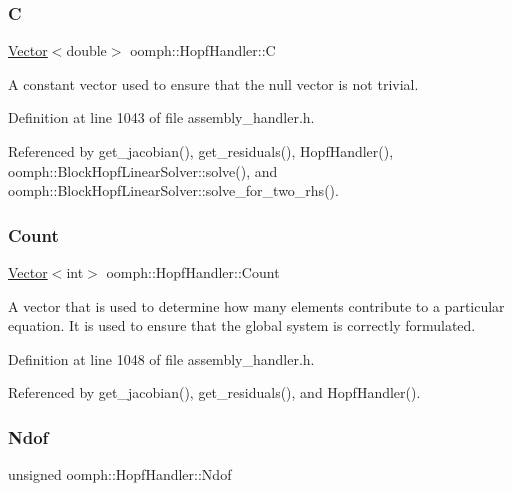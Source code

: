 \subsubsection{\texorpdfstring{C}{C}}
{\footnotesize\ttfamily \hyperlink{classoomph_1_1Vector}{Vector}$<$double$>$ oomph\+::\+Hopf\+Handler\+::C\hspace{0.3cm}{\ttfamily [private]}}



A constant vector used to ensure that the null vector is not trivial. 



Definition at line 1043 of file assembly\+\_\+handler.\+h.



Referenced by get\+\_\+jacobian(), get\+\_\+residuals(), Hopf\+Handler(), oomph\+::\+Block\+Hopf\+Linear\+Solver\+::solve(), and oomph\+::\+Block\+Hopf\+Linear\+Solver\+::solve\+\_\+for\+\_\+two\+\_\+rhs().

\mbox{\label{classoomph_1_1HopfHandler_a1b429a8220b316a487998cae04f46ec7}} 
\subsubsection{\texorpdfstring{Count}{Count}}
{\footnotesize\ttfamily \hyperlink{classoomph_1_1Vector}{Vector}$<$int$>$ oomph\+::\+Hopf\+Handler\+::\+Count\hspace{0.3cm}{\ttfamily [private]}}



A vector that is used to determine how many elements contribute to a particular equation. It is used to ensure that the global system is correctly formulated. 



Definition at line 1048 of file assembly\+\_\+handler.\+h.



Referenced by get\+\_\+jacobian(), get\+\_\+residuals(), and Hopf\+Handler().

\mbox{\label{classoomph_1_1HopfHandler_ac35b7c357ab453b686e80d8efe761945}} 
\subsubsection{\texorpdfstring{Ndof}{Ndof}}
{\footnotesize\ttfamily unsigned oomph\+::\+Hopf\+Handler\+::\+Ndof\hspace{0.3cm}{\ttfamily [private]}}



